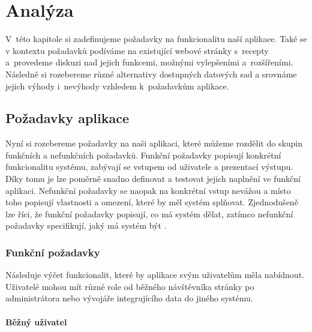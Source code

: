 
\chapter{Analýza}

V~této kapitole si zadefinujeme požadavky na funkcionalitu naší aplikace. Také se v kontextu požadavků podíváme na existující webové stránky s~recepty a~provedeme diskuzi nad jejich funkcemi, možnými vylepšeními a~rozšířeními. Následně si rozebereme různé alternativy dostupných datových sad a srovnáme jejich výhody i~nevýhody vzhledem k~požadavkům aplikace.

\section{Požadavky aplikace}

Nyní si rozebereme požadavky na naši aplikaci, které můžeme rozdělit do skupin funkčních a nefunkčních požadavků. Funkční požadavky popisují konkrétní funkcionalitu systému, zabývají se vstupem od uživatele a prezentací výstupu. Díky tomu je lze poměrně snadno definovat a testovat jejich naplnění ve funkční aplikaci. Nefunkční požadavky se naopak na konkrétní vstup nevážou a místo toho popisují vlastnosti a omezení, které by měl systém splňovat. Zjednodušeně lze říci, že funkční požadavky popisují, co má systém dělat, zatímco nefunkční požadavky specifikují, jaký má systém být \citep{app-requirements}.

\subsection{Funkční požadavky}

Následuje výčet funkcionalit, které by aplikace svým uživatelům měla nabídnout. Uživatelé mohou mít různé role od běžného návštěvníka stránky po administrátora nebo vývojáře integrujícího data do jiného systému.

\subsubsection{Běžný uživatel}

